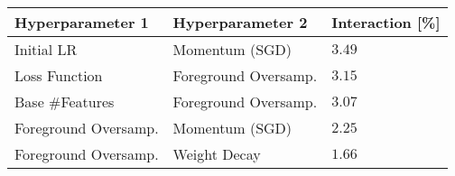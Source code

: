\begin{tabular}{lll}
\toprule
Hyperparameter 1 & Hyperparameter 2 & Interaction [\%] \\
\midrule
Initial LR & Momentum (SGD) & $3.49$ \\
Loss Function & Foreground Oversamp. & $3.15$ \\
Base #Features & Foreground Oversamp. & $3.07$ \\
Foreground Oversamp. & Momentum (SGD) & $2.25$ \\
Foreground Oversamp. & Weight Decay & $1.66$ \\
\bottomrule
\end{tabular}
